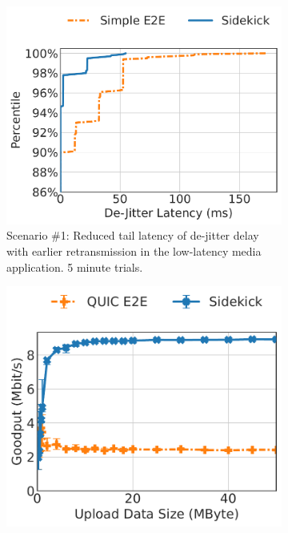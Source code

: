 \begin{figure}
\begin{subfigure}{0.34\textwidth}
\includegraphics[width=\linewidth]{sidekick/figures/fig4a_low_latency_media.pdf}
\caption{Scenario \#1:
 Reduced tail latency of de-jitter delay
with earlier retransmission in the low-latency media application. 5 minute trials.}
\label{fig:sidekick:main-results:media}
\end{subfigure}
\hfill
\begin{subfigure}{0.31\textwidth}
\includegraphics[width=0.97\linewidth]{sidekick/figures/fig4b_pep_emulation.pdf}

\end{subfigure}
\end{figure}
